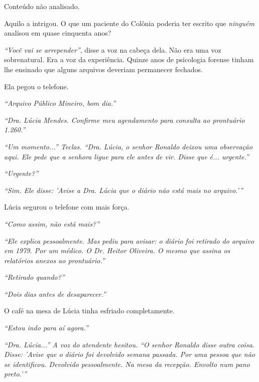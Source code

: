 \noindent Conteúdo não analisado.

\noindent Aquilo a intrigou. O que um paciente do Colônia poderia ter escrito que \textit{ninguém} analisou em quase cinquenta anos?

\noindent \textit{\textquotedblleft{}Você vai se arrepender\textquotedblright{}}, disse a voz na cabeça dela. Não era uma voz sobrenatural. Era a voz da experiência. Quinze anos de psicologia forense tinham lhe ensinado que alguns arquivos deveriam permanecer fechados.

\noindent Ela pegou o telefone.

\noindent \textit{\textquotedblleft{}Arquivo Público Mineiro, bom dia.\textquotedblright{}}

\noindent \textit{\textquotedblleft{}Dra. Lúcia Mendes. Confirme meu agendamento para consulta ao prontuário 1.260.\textquotedblright{}}

\noindent \textit{\textquotedblleft{}Um momento...\textquotedblright{}\textit{ Teclas. }\textquotedblleft{}Dra. Lúcia, o senhor Ronaldo deixou uma observação aqui. Ele pede que a senhora ligue para ele antes de vir. Disse que é... urgente.\textquotedblright{}}

\noindent \textit{\textquotedblleft{}Urgente?\textquotedblright{}}

\noindent \textit{\textquotedblleft{}Sim. Ele disse: 'Avise a Dra. Lúcia que o diário não está mais no arquivo.'\textquotedblright{}}

\noindent Lúcia segurou o telefone com mais força.

\noindent \textit{\textquotedblleft{}Como assim, não está mais?\textquotedblright{}}

\noindent \textit{\textquotedblleft{}Ele explica pessoalmente. Mas pediu para avisar: o diário foi retirado do arquivo em 1979. Por um médico. O Dr. Heitor Oliveira. O mesmo que assina os relatórios anexos ao prontuário.\textquotedblright{}}

\noindent \textit{\textquotedblleft{}Retirado quando?\textquotedblright{}}

\noindent \textit{\textquotedblleft{}Dois dias antes de desaparecer.\textquotedblright{}}

\noindent O café na mesa de Lúcia tinha esfriado completamente.

\noindent \textit{\textquotedblleft{}Estou indo para aí agora.\textquotedblright{}}

\noindent \textit{\textquotedblleft{}Dra. Lúcia...\textquotedblright{}\textit{ A voz do atendente hesitou. }\textquotedblleft{}O senhor Ronaldo disse outra coisa. Disse: 'Avise que o diário foi devolvido semana passada. Por uma pessoa que não se identificou. Devolvido pessoalmente. Na mesa da recepção. Envolto num pano preto.'\textquotedblright{}}

